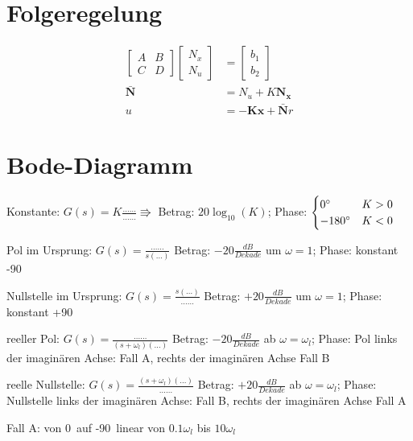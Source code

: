 \documentclass[11pt,a4paper,fleqn,headsepline]{scrreprt}
\begin{document}
\begin{multicols}{2}
        \section*{Folgeregelung}
        \begin{align*}
            \begin{bmatrix} A & B \\ C & D\end{bmatrix} \begin{bmatrix}N_x \\ N_u\end{bmatrix} &= \begin{bmatrix} b_1 \\ b_2 \end{bmatrix} \\
                \mathbf{\bar{N}} &= N_u + K \mathbf{N_x} \\
            u &= -\mathbf{K}\mathbf{x} + \mathbf{\bar{N}}r
        \end{align*}

        \section*{Bode-Diagramm}

        Konstante: \(G(s)=K\frac{\dots\dots}{\dots\dots} \Rrightarrow \) Betrag: \(20 \log_{10}(K)\); Phase: \(\begin{cases}
            0\degree & K > 0 \\
            -180\degree & K < 0
        \end{cases}\)

        Pol im Ursprung: \(G(s) = \frac{\dots\dots}{s(\dots)}\) Betrag: \(-20 \frac{dB}{Dekade}\) um \(\omega = 1\); Phase: konstant -90\degree

        Nullstelle im Ursprung: \(G(s) = \frac{s(\dots)}{\dots\dots}\) Betrag: \(+20 \frac{dB}{Dekade}\) um \(\omega = 1\); Phase: konstant +90\degree

        reeller Pol: \(G(s) = \frac{\dots\dots}{(s+\omega_l)(\dots)}\) Betrag: \(-20 \frac{dB}{Dekade}\) ab \(\omega = \omega_l\); Phase: Pol links der imaginären Achse: Fall A, rechts der imaginären Achse Fall B

        reelle Nullstelle: \(G(s) = \frac{(s+\omega_l)(\dots)}{\dots\dots}\) Betrag: \(+20 \frac{dB}{Dekade}\) ab \(\omega = \omega_l\); Phase: Nullstelle links der imaginären Achse: Fall B, rechts der imaginären Achse Fall A

        Fall A: von 0\degree\ auf -90\degree\ linear von \(0.1\omega_l\) bis \(10\omega_l\)


\end{multicols}
\end{document}
